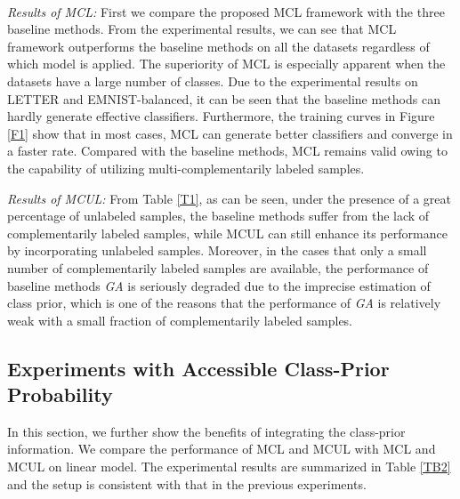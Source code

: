 \documentclass[]{article} \usepackage{geometry}
\begin{document}
\begin{figure*}[htbp]
\\
\caption{The training curves of baseline methods and MCL on flexible models.}

\label{F1}
\end{figure*}
{\em Results of MCL:} First we compare the proposed MCL framework with the three baseline methods. From the experimental results, we can see that MCL framework outperforms the baseline methods on all the datasets regardless of which model is applied. The superiority of MCL is especially apparent when the datasets have a large number of classes. Due to the experimental results on LETTER and EMNIST-balanced, it can be seen that the baseline methods can hardly generate effective classifiers. Furthermore, the training curves in Figure \ref{F1} show that in most cases, MCL can generate better classifiers and converge in a faster rate. Compared with the baseline methods, MCL remains valid owing to the capability of utilizing multi-complementarily labeled samples.

{\em Results of MCUL:} From Table \ref{T1}, as can be seen, under the presence of a great percentage of unlabeled samples, the baseline methods suffer from the lack of complementarily labeled samples, while MCUL can still enhance its performance by incorporating unlabeled samples. Moreover, in the cases that only a small number of complementarily labeled samples are available, the performance of baseline methods \textit{GA} is seriously degraded due to the imprecise estimation of class prior, which is one of the reasons that the performance of \textit{GA} is relatively weak with a small fraction of complementarily labeled samples.
\subsection{Experiments with Accessible Class-Prior Probability}
In this section, we further show the benefits of integrating the class-prior information. We compare the performance of MCL and MCUL with MCL and MCUL on linear model. The experimental results are summarized in Table \ref{TB2} and the setup is consistent with that in the previous experiments.
\end{document}

